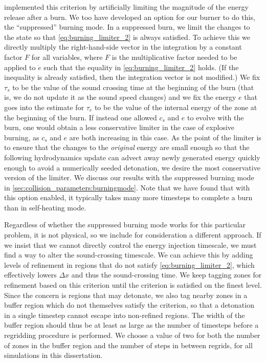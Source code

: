 \documentclass[12pt]{article}
\begin{document}
\citet{kushnir:2013} implemented this criterion by artificially
limiting the magnitude of the energy release after a burn. We
too have developed an option for our burner to do this,
the ``suppressed'' burning mode. In a suppressed burn, we limit
the changes to the state so that \autoref{eq:burning_limiter_2}
is always satisfied. To achieve this we directly multiply the
right-hand-side vector in the integration by a constant factor $F$
for all variables, where $F$ is the multiplicative factor needed to
be applied to $\dot{e}$ such that the equality in \autoref{eq:burning_limiter_2}
holds. (If the inequality is already satisfied, then the integration
vector is not modified.) We fix $\tau_s$ to be the value of the sound
crossing time at the beginning of the burn (that is, we do not
update it as the sound speed changes) and we fix the energy $e$
that goes into the estimate for $\tau_e$ to be the value of the
internal energy of the zone at the beginning of the burn. If
instead one allowed $c_s$ and $e$ to evolve with the burn, one
would obtain a less conservative limiter in the case of explosive
burning, as $c_s$ and $e$ are both increasing in this case.
As the point of the limiter is to ensure that the changes to the
\textit{original} energy are small enough so that the following
hydrodynamics update can advect away newly generated energy
quickly enough to avoid a numerically seeded detonation,
we desire the most conservative version of the limiter. We discuss
our results with the suppressed burning mode in \autoref{sec:collision_parameters:burningmode}.
Note that we have found that with this option enabled, it typically takes
many more timesteps to complete a burn than in self-heating mode.

Regardless of whether the suppressed burning mode works for this
particular problem, it is not physical, so we include for
consideration a different approach. If we insist that we
cannot directly control the energy injection timescale, we
must find a way to alter the sound-crossing timescale.
We can achieve this by adding levels of refinement in
regions that do not satisfy \autoref{eq:burning_limiter_2},
which effectively lowers $\Delta x$ and thus the
sound-crossing time. We keep tagging zones for refinement
based on this criterion until the criterion is satisfied
on the finest level. Since the concern is regions that
may detonate, we also tag nearby zones in a buffer region
which do not themselves satisfy the criterion,
so that a detonation in a single timestep cannot
escape into non-refined regions. The width of the buffer
region should thus be at least as large as the number of
timesteps before a regridding procedure is performed.
We choose a value of two for both the number of zones in the
buffer region and the number of steps in between regrids,
for all simulations in this dissertation.
\end{document}
